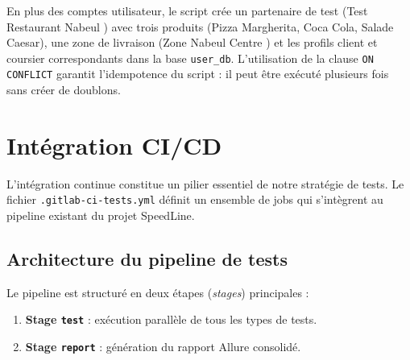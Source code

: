 En plus des comptes utilisateur, le script crée un partenaire de test
(\og Test Restaurant Nabeul \fg{}) avec trois produits (Pizza Margherita, Coca Cola,
Salade Caesar), une zone de livraison (\og Zone Nabeul Centre \fg{}) et les profils
client et coursier correspondants dans la base \texttt{user\_db}. L'utilisation de
la clause \texttt{ON CONFLICT} garantit l'idempotence du script : il peut être exécuté
plusieurs fois sans créer de doublons.

\section{Intégration CI/CD}
\label{sec:integration-cicd}

L'intégration continue constitue un pilier essentiel de notre stratégie de tests.
Le fichier \texttt{.gitlab-ci-tests.yml} définit un ensemble de jobs qui s'intègrent
au pipeline existant du projet SpeedLine.

\subsection{Architecture du pipeline de tests}

Le pipeline est structuré en deux étapes (\textit{stages}) principales :

\begin{enumerate}
  \item \textbf{Stage \texttt{test}} : exécution parallèle de tous les types de tests.
  \item \textbf{Stage \texttt{report}} : génération du rapport Allure consolidé.
\end{enumerate}

